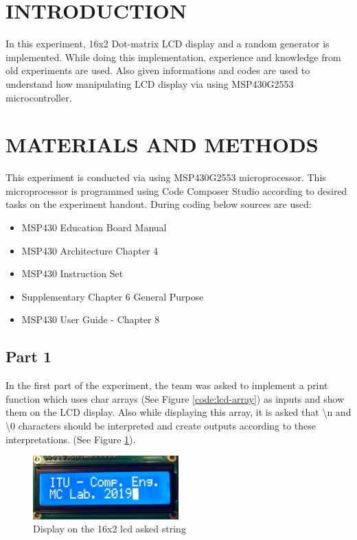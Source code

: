 \documentclass[pdftex,12pt,a4paper]{article}
\begin{document}
\section{INTRODUCTION}

In this experiment, 16x2 Dot-matrix LCD display and a random generator is implemented. While doing this implementation, experience and knowledge from old experiments are used. Also given informations and codes are used to understand how manipulating LCD display via using MSP430G2553 microcontroller.

\section{MATERIALS AND METHODS}

This experiment is conducted via using MSP430G2553 microprocessor. This microprocessor is programmed using Code Composer Studio according to desired tasks on the experiment handout. During coding below sources are used:

\begin{itemize}
    \item MSP430 Education Board Manual \cite{ref2}
    \item MSP430 Architecture Chapter 4 \cite{ref3}
    \item MSP430 Instruction Set \cite{ref4}
    \item Supplementary Chapter 6 General Purpose \cite{ref5}
    \item MSP430 User Guide - Chapter 8 \cite{ref5}
\end{itemize}

\subsection{Part 1}

In the first part of the experiment, the team was asked to implement a print function which uses char arrays (See Figure \ref{code:lcd-array}) as inputs and show them on the LCD display. Also while displaying this array, it is asked that \textbackslash{n} and \textbackslash{0} characters should be interpreted and create outputs according to these interpretations. (See Figure \ref{fig:output-lcd}).

\begin{figure}[H]
    \centering
    \includegraphics[width=0.5\textwidth]{output_lcd.png}
    \caption{Display on the 16x2 lcd asked string}
    \label{fig:output-lcd}
\end{figure}
\end{document}
